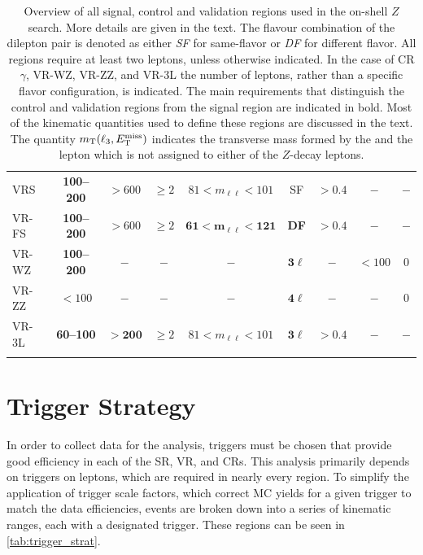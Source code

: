 \begin{table}[htbp]
\begin{center}
{\begin{tabular}{lcccccccc}
   VRS  &  {\bf 100--200}     &  $> 600 $  &  $\geq 2$  &    $81 < m_{\ell\ell} < 101$       &  SF        & $>0.4$  & $-$ & $-$ \\
   VR-FS & {\bf 100--200}     &  $> 600 $  &  $\geq 2$  &    $\mathbf{61 < m_{\ell\ell} < 121}$  &  {\bf DF}        & $>0.4$  & $-$ & $-$ \\
   VR-WZ  &  {\bf 100--200}   &     $-$      &   $-$        &         $-$                          &  $\mathbf{3\ell}$   &    $-$    & $<100$  &  $0$  \\
   VR-ZZ  &  {\bf $<100$}     &     $-$      &   $-$        &         $-$                          &  $\mathbf{4\ell}$   &    $-$    &  $-$      & $0$   \\
   VR-3L  &  {\bf 60--100}    &  $\mathbf{> 200}$  &  $\geq 2$  &   $81 < m_{\ell\ell} < 101$        &  $\mathbf{3\ell}$   & $>0.4$  & $-$ & $-$ \\
   \noalign{\smallskip}\hline\noalign{\smallskip}
\end{tabular}
} %
 \caption{Overview of all signal, control and validation regions used in the on-shell $Z$ search.
 More details are given in the text.
 The flavour combination of the dilepton pair is denoted as either \textit{SF} for same-flavor or \textit{DF} for different flavor.
 All regions require at least two leptons, unless otherwise indicated.
 In the case of CR$\gamma$, VR-WZ, VR-ZZ, and VR-3L the number of leptons, rather than a specific flavor configuration, is indicated.
The main requirements that distinguish the control and validation regions from the signal region are indicated in bold.
Most of the kinematic quantities used to define these regions are discussed in the text. The quantity $m_{\text{T}}(\ell_{3},E_{\text{T}}^{\text{miss}})$
indicates the transverse mass formed by the \met and the lepton which is not assigned to either of the $Z$-decay leptons. }
\label{tab:regions-z}
\end{center}
\end{table}

\section{Trigger Strategy}
\label{sec:trig_strategy}

In order to collect data for the analysis, triggers must be chosen that provide good efficiency in each of the \ac{SR}, \ac{VR}, and \acp{CR}. This analysis primarily depends on triggers on leptons, which are required in nearly every region. To simplify the application of trigger scale factors, which correct \ac{MC} yields for a given trigger to match the data efficiencies, events are broken down into a series of kinematic ranges, each with a designated trigger. These regions can be seen in \autoref{tab:trigger_strat}. 

